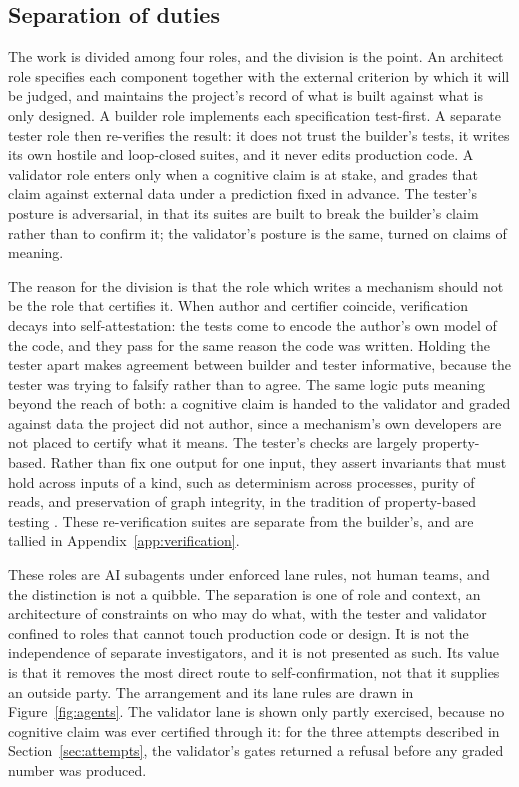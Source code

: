 \documentclass[11pt]{article}
\begin{document}
\subsection{Separation of duties}

The work is divided among four roles, and the division is the point. An architect role
specifies each component together with the external criterion by which it will be
judged, and maintains the project's record of what is built against what is only
designed. A builder role implements each specification test-first. A separate tester
role then re-verifies the result: it does not trust the builder's tests, it writes its
own hostile and loop-closed suites, and it never edits production code. A validator role
enters only when a cognitive claim is at stake, and grades that claim against external
data under a prediction fixed in advance. The tester's posture is adversarial, in that
its suites are built to break the builder's claim rather than to confirm it; the
validator's posture is the same, turned on claims of meaning.

The reason for the division is that the role which writes a mechanism should not be the
role that certifies it. When author and certifier coincide, verification decays into
self-attestation: the tests come to encode the author's own model of the code, and they
pass for the same reason the code was written. Holding the tester apart makes agreement
between builder and tester informative, because the tester was trying to falsify rather
than to agree. The same logic puts meaning beyond the reach of both: a cognitive claim
is handed to the validator and graded against data the project did not author, since a
mechanism's own developers are not placed to certify what it means. The tester's checks
are largely property-based. Rather than fix one output for one input, they assert
invariants that must hold across inputs of a kind, such as determinism across processes,
purity of reads, and preservation of graph integrity, in the tradition of property-based
testing \citep{claessen2000quickcheck, maciver2019hypothesis}. These re-verification
suites are separate from the builder's, and are tallied in Appendix~\ref{app:verification}.

These roles are AI subagents under enforced lane rules, not human teams, and the
distinction is not a quibble. The separation is one of role and context, an architecture
of constraints on who may do what, with the tester and validator confined to roles that
cannot touch production code or design. It is not the independence of separate
investigators, and it is not presented as such. Its value is that it removes the most
direct route to self-confirmation, not that it supplies an outside party. The
arrangement and its lane rules are drawn in Figure~\ref{fig:agents}. The validator lane
is shown only partly exercised, because no cognitive claim was ever certified through
it: for the three attempts described in Section~\ref{sec:attempts}, the validator's gates
returned a refusal before any graded number was produced.
\end{document}
